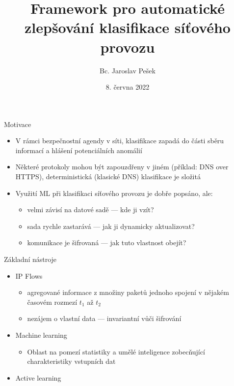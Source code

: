 \documentclass{beamer}
\title{Framework pro automatické zlepšování klasifikace síťového provozu}
\author{Bc. Jaroslav Pešek}
\institute{Fakulta informačních technologií ČVUT \\ \vspace{0.2cm} Vedoucí: Ing. Dominik Soukup}
\date{8. června 2022}
\begin{document}
\frame[plain]{\titlepage}

\begin{frame}{Motivace}

\begin{itemize}
    \item V rámci bezpečnostní agendy v síti, klasifikace zapadá do části sběru informací a hlášení potenciálních anomálií
    \item Některé protokoly mohou být zapouzdřeny v jiném (příklad: DNS over HTTPS), deterministická (klasické DNS) klasifikace je složitá

    \item Využití ML při klasifikaci síťového provozu je dobře popsáno, ale:
    \begin{itemize}
        \item velmi závisí na datové sadě --- kde ji vzít?
        \item sada rychle zastarává --- jak ji dynamicky aktualizovat?
        \item komunikace je šifrovaná --- jak tuto vlastnost obejít?
    \end{itemize}
\end{itemize}

\end{frame}


\begin{frame}{Základní nástroje}
    
\begin{itemize}
    \item IP Flows
    \begin{itemize}
        \item agregované informace z množiny paketů jednoho spojení v nějakém časovém rozmezí $t_1$ až $t_2$
        \item nezájem o vlastní data --- invariantní vůči šifrování
    \end{itemize}
    \item Machine learning
    \begin{itemize}
        \item Oblast na pomezí statistiky a umělé inteligence zobecňující charakteristiky vstupních dat  
    \end{itemize}
    \item Active learning
\end{itemize}
\end{frame}
\end{document}
